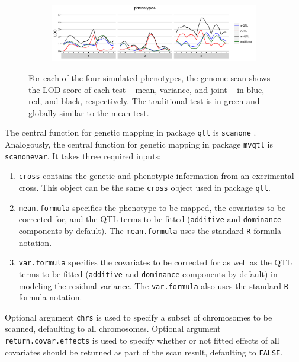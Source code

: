 \documentclass{article}
\begin{document}
\begin{figure}[t]
    \begin{subfigure}[b]{0.9\textwidth}
        \includegraphics[width=\textwidth]{images/LOD_scan_phenotype4.pdf}
    \end{subfigure}
    \caption{For each of the four simulated phenotypes, the genome scan shows the LOD score of each test -- mean, variance, and joint -- in blue, red, and black, respectively.  The traditional test is in green and globally similar to the mean test. \label{fig:lod_score_scans}}
\end{figure}

The central function for genetic mapping in package \texttt{qtl} is \texttt{scanone} \citep{Broman2003}.
Analogously, the central function for genetic mapping in package \texttt{mvqtl} is \texttt{scanonevar}.
It takes three required inputs:

\begin{enumerate}
    \item \texttt{cross} contains the genetic and phenotypic information from an exerimental cross.  This object can be the same \texttt{cross} object used in package \texttt{qtl}.
    \item \texttt{mean.formula} specifies the phenotype to be mapped, the covariates to be corrected for, and the QTL terms to be fitted (\texttt{additive} and \texttt{dominance} components by default).  The \texttt{mean.formula} uses the standard \texttt{R} formula notation.
    \item \texttt{var.formula} specifies the covariates to be corrected for as well as the QTL terms to be fitted (\texttt{additive} and \texttt{dominance} components by default) in modeling the residual variance.  The \texttt{var.formula} also uses the standard \texttt{R} formula notation.
\end{enumerate}

Optional argument \texttt{chrs} is used to specify a subset of chromosomes to be scanned, defaulting to all chromosomes.
Optional argument \texttt{return.covar.effects} is used to specify whether or not fitted effects of all covariates should be returned as part of the scan result, defaulting to \texttt{FALSE}.
\end{document}
